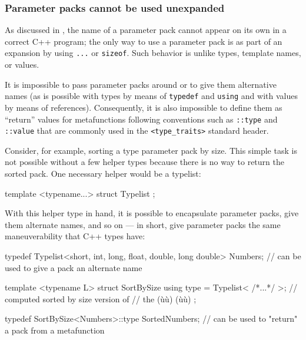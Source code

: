 \subsubsection[Parameter packs cannot be used unexpanded]{Parameter packs cannot be used unexpanded}\label{parameter-packs-cannot-be-used-unexpanded}

As discussed in , the name of a
parameter pack cannot appear on its own in a correct C++ program; the
only way to use a parameter pack is as part of an expansion by using
\lstinline!...! or \lstinline!sizeof!. Such behavior is unlike types, template
names, or values.

It is impossible to pass parameter packs around or to give them
alternative names (as is possible with types by means of
\lstinline!typedef! and \lstinline!using! and with values by means of
references). Consequently, it is also impossible to define them as
``return'' values for metafunctions following conventions such as
\lstinline!::type! and \lstinline!::value! that are commonly used in the
\lstinline!<type_traits>! standard header.

Consider, for example, sorting a type parameter pack by size. This
simple task is not possible without a few helper types because there is
no way to return the sorted pack. One necessary helper would be a
typelist:

\begin{emcppslisting}[emcppsbatch=e43]
template <typename...> struct Typelist { };
\end{emcppslisting}
    

\noindent With this helper type in hand, it is possible to encapsulate parameter
packs, give them alternate names, and so on --- in short, give parameter
packs the same maneuverability that C++ types have:

\begin{emcppslisting}[emcppsbatch=e43]
typedef Typelist<short, int, long, float, double, long double> Numbers;
    // can be used to give a pack an alternate name

template <typename L>
struct SortBySize
{
    using type = Typelist< /*...*/ >;  // computed sorted by size version of
                                       // the (ù{}ù) (ù{}ù) 
};

typedef SortBySize<Numbers>::type SortedNumbers;
    // can be used to "return" a pack from a metafunction
\end{emcppslisting}
    

